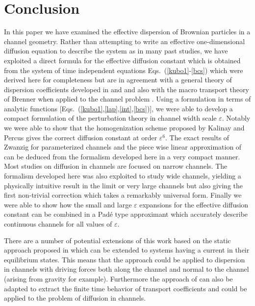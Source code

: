 \documentclass[pre,showpacs,preprintnumbers,amsmath,amssymb,superscriptaddress]{revtex4-1}
\begin{document}
{{\section{Conclusion}
In this paper we have examined the effective dispersion of Brownian particles in a channel geometry. Rather than attempting to write an effective one-dimensional diffusion equation to describe the system as in many past studies, we have exploited a direct formula for the effective diffusion constant which is obtained from the system of time independent equations Eqs.~(\ref{kubo1}-\ref{bcs}) which were derived here for completeness but are in agreement with a general theory of dispersion coefficients developed in \cite{gue2015a} and \cite{gue2015b} and also with the macro transport theory of Brenner \cite{bre1993} when applied to the channel problem \cite{dorfman2014assessing}. Using a formulation in terms of analytic functions [Eqs.~(\ref{kubo1},\ref{lap},\ref{int},\ref{bcs})], we were able to develop a compact formulation of the perturbation theory in channel width scale $\varepsilon$. Notably we were able to show that the homogenization scheme proposed by Kalinay and Percus \cite{kal2006} gives the correct diffusion constant at order $\varepsilon^6$. The exact results of Zwanzig for parameterized channels and the piece wise linear approximation of \cite{kal2006} can 
be deduced from the formalism developed here in a very compact manner. Most studies on diffusion in channels are focused on narrow channels. The formalism developed here was also exploited to study wide channels, yielding a physically intuitive result in the limit or very large channels but also giving the first non-trivial correction which takes a remarkably universal form. Finally we were able to show how the small and large $\varepsilon$ expansions for the effective diffusion constant can be combined in a Pad\'e type approximant which accurately describe continuous channels for all values of $\varepsilon$. 

There are a number of potential extensions of this work based on the static approach proposed in \cite{gue2015a,gue2015b} which can be extended to systems having a current in their equilibrium states. This means that the approach could be applied to dispersion in channels with driving forces both along the channel and normal to the channel \cite{gho2010,bur2008,burada2009diffusion}(arising from gravity for example). Furthermore the approach of \cite{gue2015a,gue2015b} can also be adapted to extract the finite time behavior of transport coefficients and could be applied to the problem of diffusion in channels.

}}
\end{document}
